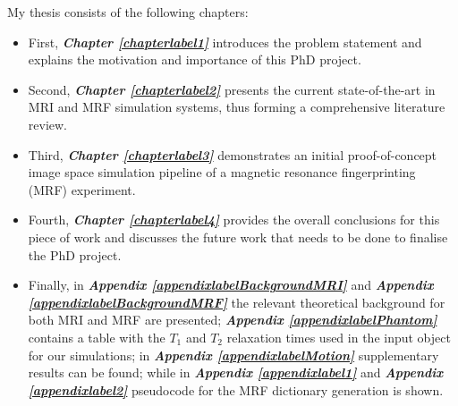 My thesis consists of the following chapters:
\begin{itemize} 
	\item First, \textbf{\textit{Chapter \ref{chapterlabel1}}} introduces the problem statement and explains the motivation and importance of this PhD project.

	\item Second, \textbf{\textit{Chapter \ref{chapterlabel2}}} presents the current state-of-the-art in MRI and MRF simulation systems, thus forming a comprehensive literature review.

	\item Third, \textbf{\textit{Chapter \ref{chapterlabel3}}} demonstrates an initial proof-of-concept image space simulation pipeline of a magnetic resonance fingerprinting (MRF) experiment.
	
	\item Fourth, \textbf{\textit{Chapter \ref{chapterlabel4}}} provides the overall conclusions for this piece of work and discusses the future work that needs to be done to finalise the PhD project.

	\item Finally, in \textbf{\textit{Appendix \ref{appendixlabelBackgroundMRI}}} and \textbf{\textit{Appendix \ref{appendixlabelBackgroundMRF}}} the relevant theoretical background for both MRI and MRF are presented;
	\textbf{\textit{Appendix \ref{appendixlabelPhantom}}} contains a table with the $T_1$ and $T_2$ relaxation times used in the input object for our simulations;
	in \textbf{\textit{Appendix \ref{appendixlabelMotion}}} supplementary results can be found;
	while in \textbf{\textit{Appendix \ref{appendixlabel1}}} and \textbf{\textit{Appendix \ref{appendixlabel2}}} pseudocode for the MRF dictionary generation is shown.

\end{itemize}









